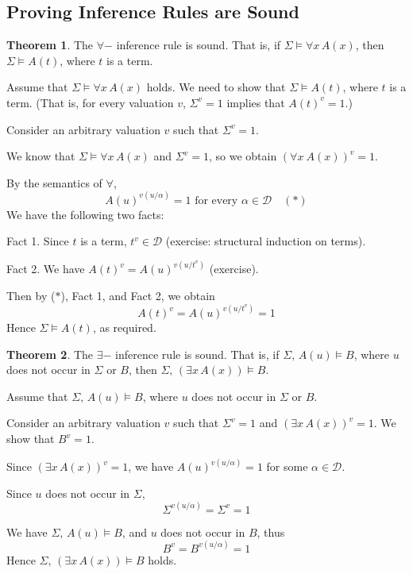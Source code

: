 \documentclass[11pt]{article}
\makeatletter
\theoremstyle{definition}
\newtheorem{thm}{Theorem}[section]
\newenvironment{pf}[1][\proofname]{\par
  \pushQED{\qed}%
  \normalfont \topsep0\p@\relax
  \trivlist
  \item[\hskip\labelsep\itshape
  #1\@addpunct{.}]\ignorespaces
}{%
  \popQED\endtrivlist\@endpefalse
}
\makeatother
\begin{document}
\subsection{Proving Inference Rules are Sound}
\begin{thm}
The $\forall-$ inference rule is sound. That is, if $\Sigma \vDash \forall x \, A(x)$, then $\Sigma \vDash A(t)$, where $t$ is a term.

\begin{pf}
Assume that $\Sigma \vDash \forall x \, A(x)$ holds. We need to show that $\Sigma \vDash A(t)$, where $t$ is a term. (That is, for every valuation $v$, $\Sigma^v = 1$ implies that $A(t)^v = 1$.) 

Consider an arbitrary valuation $v$ such that $\Sigma^v = 1$.

We know that $\Sigma \vDash \forall x \, A(x)$ and $\Sigma^v = 1$, so we obtain $(\forall x \ A(x))^v = 1$. 

By the semantics of $\forall$,
$$A(u)^{v(u/\alpha)} = 1 \text{ for every } \alpha \in \mathcal{D} \quad (*)$$
We have the following two facts:

{\sc Fact 1.} Since $t$ is a term, $t^v \in \mathcal{D}$ (exercise: structural induction on terms).

{\sc Fact 2.} We have $A(t)^v = A(u)^{v(u/t^v)}$ (exercise).

Then by ($*$), Fact 1, and Fact 2, we obtain
$$A(t)^v = A(u)^{v(u/t^v)} = 1$$
Hence $\Sigma \vDash A(t)$, as required.
\end{pf}
\end{thm}

\begin{thm}
The $\exists-$ inference rule is sound. That is, if $\Sigma,\, A(u) \vDash B$, where $u$ does not occur in $\Sigma$ or $B$, then $\Sigma,\, (\exists x\, A(x)) \vDash B$.
\begin{pf}
Assume that $\Sigma,\, A(u) \vDash B$, where $u$ does not occur in $\Sigma$ or $B$.

Consider an arbitrary valuation $v$ such that $\Sigma^v = 1$ and $(\exists x\,A(x))^v = 1$. We show that $B^v = 1$.

Since $(\exists x\, A(x))^v = 1$, we have $A(u)^{v(u/\alpha)} = 1$ for some $\alpha \in \mathcal{D}$. 

Since $u$ does not occur in $\Sigma$, 
$$\Sigma^{v(u/\alpha)} = \Sigma^v = 1$$

We have $\Sigma,\, A(u) \vDash B$, and $u$ does not occur in $B$, thus
$$B^v = B^{v(u/\alpha)} = 1$$
Hence $\Sigma,\, (\exists x\, A(x)) \vDash B$ holds.
\end{pf}
\end{thm}
\end{document}
